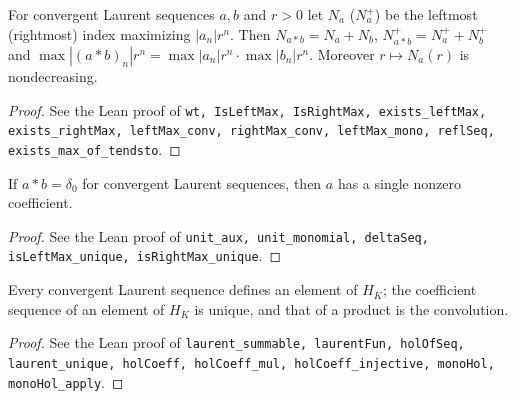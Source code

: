 \begin{lemma}
\label{lem:gauss-extremal}
\leanok
For convergent Laurent sequences $a,b$ and $r>0$ let $N_a$ ($N_a^+$) be the leftmost (rightmost) index maximizing $|a_n|r^n$. Then $N_{a*b}=N_a+N_b$, $N^+_{a*b}=N^+_a+N^+_b$ and $\max|(a*b)_n|r^n=\max|a_n|r^n\cdot\max|b_n|r^n$. Moreover $r\mapsto N_a(r)$ is nondecreasing.
\end{lemma}
\begin{proof}
\leanok
See the Lean proof of \texttt{wt, IsLeftMax, IsRightMax, exists\_leftMax, exists\_rightMax, leftMax\_conv, rightMax\_conv, leftMax\_mono, reflSeq, exists\_max\_of\_tendsto}.
\end{proof}

\begin{lemma}
\label{lem:unit-convolution}
\leanok
If $a*b=\delta_0$ for convergent Laurent sequences, then $a$ has a single nonzero coefficient.
\end{lemma}
\begin{proof}
\leanok
See the Lean proof of \texttt{unit\_aux, unit\_monomial, deltaSeq, isLeftMax\_unique, isRightMax\_unique}.
\end{proof}

\begin{proposition}
\label{prop:laurent-coefficients}
\leanok
Every convergent Laurent sequence defines an element of $H_K$; the coefficient sequence of an element of $H_K$ is unique, and that of a product is the convolution.
\end{proposition}
\begin{proof}
\leanok
See the Lean proof of \texttt{laurent\_summable, laurentFun, holOfSeq, laurent\_unique, holCoeff, holCoeff\_mul, holCoeff\_injective, monoHol, monoHol\_apply}.
\end{proof}

